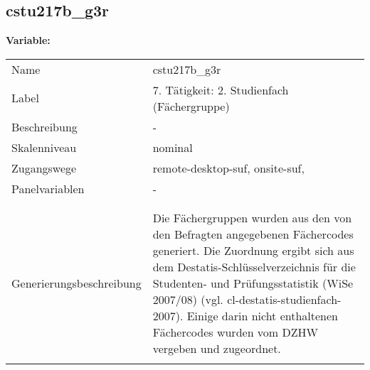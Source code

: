 	
	
	\subsection{cstu217b\_g3r}
	\label{subSection:cstu217b_g3r}

	\noindent\textbf{Variable:}\\
		\begin{tabular}{lL{11.3cm}}
			\label{tableVariable:cstu217b_g3r}
			Name & cstu217b\_g3r \\
			Label & 7. Tätigkeit: 2. Studienfach (Fächergruppe) \\
			Beschreibung & - \\
			Skalenniveau & nominal \\
			Zugangswege &
				remote-desktop-suf,
				onsite-suf,
 \\
			Panelvariablen & -
			 \\
			 \\
 \\
					Generierungsbeschreibung & Die Fächergruppen wurden aus den von den Befragten angegebenen Fächercodes generiert. Die Zuordnung ergibt sich aus dem Destatis-Schlüsselverzeichnis für die Studenten- und Prüfungsstatistik (WiSe 2007/08) (vgl. cl-destatis-studienfach-2007).  Einige darin nicht enthaltenen Fächercodes wurden vom DZHW vergeben und zugeordnet. 
				 \\	
			 \\
		\end{tabular}






